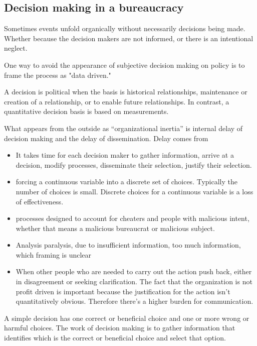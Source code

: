 \subsection{Decision making in a bureaucracy}

Sometimes events unfold organically without necessarily decisions being made. Whether because the decision makers are not informed, or there is an intentional neglect.

One way to avoid the appearance of subjective decision making on policy is to frame the process as "data driven." 


A decision is political when the basis is historical relationships, maintenance or creation of a relationship, or to enable future relationships.
In contrast, a quantitative decision basis is based on measurements.


What appears from the outside as ``organizational inertia'' is internal delay of decision making and the delay of dissemination. 
Delay comes from
\begin{itemize}
    \item It takes time for each decision maker to gather information, arrive at a decision, modify processes, disseminate their selection, justify their selection. 
    \item forcing a continuous variable into a discrete set of choices. Typically the number of choices is small. Discrete choices for a continuous variable is a loss of effectiveness.
    \item processes designed to account for cheaters and people with malicious intent, whether that means a malicious bureaucrat or malicious subject. 
\item Analysis paralysis, due to {insufficient information, too much information, which framing is unclear}
\item When other people who are needed to carry out the action push back, either in disagreement or seeking clarification. The fact that the organization is not profit driven is important because the justification for the action isn't quantitatively obvious. Therefore there's a higher burden for communication.
\end{itemize}


A \gls{simple decision} has one correct or beneficial choice and one or more wrong or harmful choices. The work of decision making is to gather information that identifies which is the correct or beneficial choice and select that option.

